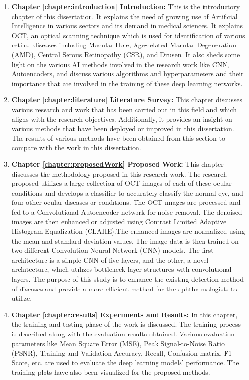 \begin{enumerate}
    \item \textbf{Chapter \ref{chapter:introduction} Introduction:} This is the introductory chapter of this dissertation. It explains the need of growing use of Artificial Intelligence in various sectors and its demand in medical sciences. It explains OCT, an optical scanning technique which is used for identification of various retinal diseases including Macular Hole, Age-related Macular Degeneration (AMD), Central Serous Retinopathy (CSR), and Drusen. It also sheds some light on the various AI methods involved in the research work like CNN, Autoencoders, and discuss various algorithms and hyperparameters and their importance that are involved in the training of these deep learning networks. 
    
    \item \textbf{Chapter \ref{chapter:literature} Literature Survey:} This chapter discusses various research and work that has been carried out in this field and which aligns with the research objectives. Additionally, it provides an insight on various methods that have been deployed or improved in this dissertation. The results of various methods have been obtained from this section to compare with the work in this dissertation.
    
    \item \textbf{Chapter \ref{chapter:proposedWork} Proposed Work:} This chapter discusses the methodology proposed in this research work. The research proposed utilizes a large collection of OCT images of each of these ocular conditions and develops a classifier to accurately classify the normal eye, and four other ocular diseases or conditions. The OCT images are processed and fed to a Convolutional Autoencoder network for noise removal. The denoised images are then enhanced or adjusted using Contrast Limited Adaptive Histogram Equalization (CLAHE).The enhanced images are normalized using the mean and standard deviation values. The image data is then trained on two different Convolution Neural Network (CNN) models. The first architecture is a simple CNN of five layers, and the other, a novel architecture, which utilizes bottleneck layer structures with convolutional layers. The purpose of this study is to enhance the existing detection method of diseases and provide a more efficient method for the ophthalmologists to utilize.
    
    \item \textbf{Chapter \ref{chapter:results} Experiments and Results:} In this chapter, the training and testing phase of the work is discussed. The training process is described along with the evaluation results obtained. Various evaluation parameters like Mean Square Error (MSE), Peak Signal-to-Noise Ratio (PSNR), Training and Validation Accuracy, Recall, Confusion matrix, F1 Score, etc. are used to evaluate the deep learning models’ performance. The training plots have also been visualized for the proposed methods.
    

\end{enumerate}
